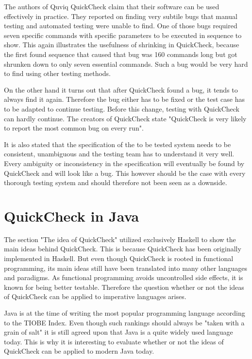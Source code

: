 \documentclass[a4paper, 12pt]{article} %
\begin{document}
The authors of Quviq QuickCheck claim that their software can be used effectively in practice. They reported on finding very subtile bugs that manual testing and automated testing were unable to find. One of those bugs required seven specific commands with specific parameters to be executed in sequence to show. This again illustrates the usefulness of shrinking in QuickCheck, because the first found sequence that caused that bug was 160 commands long but got shrunken down to only seven essential commands. Such a bug would be very hard to find using other testing methods. \cite{Arts06}

On the other hand it turns out that after QuickCheck found a bug, it tends to always find it again. Therefore the bug either has to be fixed or the test case has to be adapted to continue testing. Before this change, testing with QuickCheck can hardly continue. The creators of QuickCheck state "QuickCheck is very likely to report the most common bug on every run". \cite{Arts06}

It is also stated that the specification of the to be tested system needs to be consistent, unambiguous and the testing team has to understand it very well. Every ambiguity or inconsistency in the specification will eventually be found by QuickCheck and will look like a bug. This however should be the case with every thorough testing system and should therefore not been seen as a downside. \cite{Arts06}


\newpage
\section{QuickCheck in Java}

The section "The idea of QuickCheck" utilized exclusively Haskell to show the main ideas behind QuickCheck. This is because QuickCheck has been originally implemented in Haskell. But even though QuickCheck is rooted in functional programming, its main ideas still have been translated into many other languages and paradigms. As functional programming avoids uncontrolled side effects, it is known for being better testable. Therefore the question whether or not the ideas of QuickCheck can be applied to imperative languages arises. 

Java is at the time of writing the most popular programming language according to the TIOBE Index. \cite{tiobe2018} Even though such rankings should always be "taken with a grain of salt" it is still agreed upon that Java is a quite widely used language today. This is why it is interesting to evaluate whether or not the ideas of QuickCheck can be applied to modern Java today.
\end{document}
